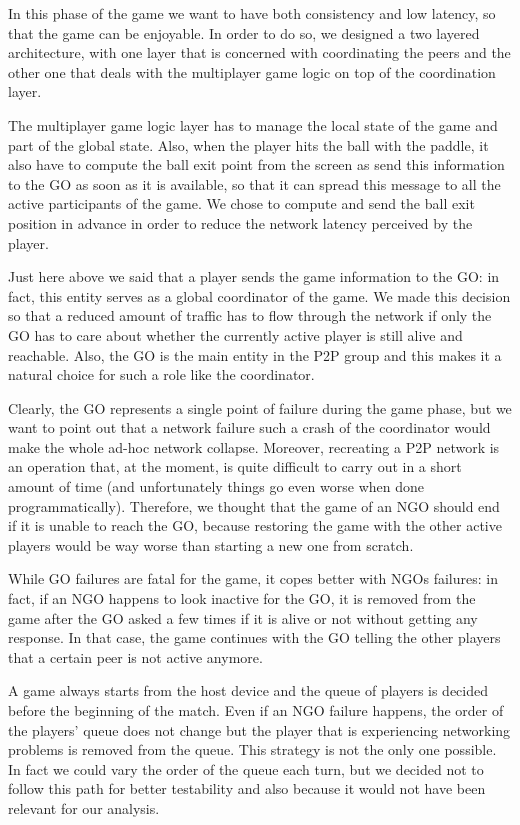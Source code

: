 In this phase of the game we want to have both consistency and low latency, so
that the game can be enjoyable. In order to do so, we designed a two layered
architecture, with one layer that is concerned with coordinating the peers and
the other one that deals with the multiplayer game logic on top of the
coordination layer.

The multiplayer game logic layer has to manage the local state of the game and
part of the global state. Also, when the player hits the ball with the paddle,
it also have to compute the ball exit point from the screen as send this
information to the GO as soon as it is available, so that it can spread this
message to all the active participants of the game. We chose to compute and
send the ball exit position in advance in order to reduce the network latency
perceived by the player.

Just here above we said that a player sends the game information to the GO:
in fact, this entity serves as a global coordinator of the game. We made this
decision so that a reduced amount of traffic has to flow through the network
if only the GO has to care about whether the currently active player is still
alive and reachable. Also, the GO is the main entity in the P2P group and this
makes it a natural choice for such a role like the coordinator.

Clearly, the GO represents a single point of failure during the game phase, but
we want to point out that a network failure such a crash of the coordinator
would make the whole ad-hoc network collapse. Moreover, recreating a P2P
network is an operation that, at the moment, is quite difficult to carry out
in a short amount of time (and unfortunately things go even worse when done
programmatically). Therefore, we thought that the game of an NGO should end if
it is unable to reach the GO, because restoring the game with the other active
players would be way worse than starting a new one from scratch.

While GO failures are fatal for the game, it copes better with NGOs failures:
in fact, if an NGO happens to look inactive for the GO, it is removed from the
game after the GO asked a few times if it is alive or not without getting any
response. In that case, the game continues with the GO telling the other
players that a certain peer is not active anymore.

A game always starts from the host device and the queue of players is decided
before the beginning of the match. Even if an NGO failure happens, the order of
the players' queue does not change but the player that is experiencing
networking problems is removed from the queue.
This strategy is not the only one possible.
In fact we could vary the order of the queue each turn, but we decided
not to follow this path for better testability and also because it would not
have been relevant for our analysis.
